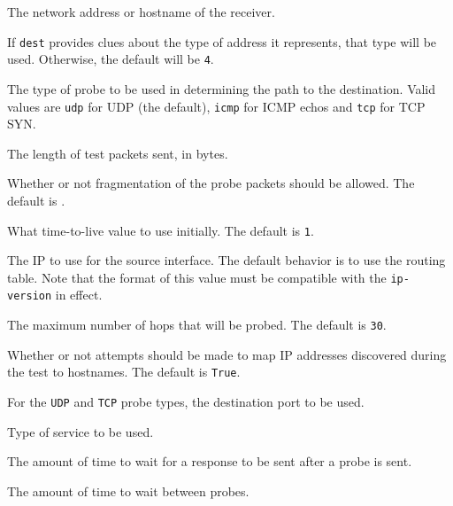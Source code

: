\documentclass[10pt]{article}
\begin{document}
 The network address or hostname of the receiver.

 If {\tt dest} provides clues about the type of
address it represents, that type will be used.  Otherwise, the default
will be {\tt 4}.

 The type of probe to be used in
determining the path to the destination.  Valid values are {\tt udp}
for UDP (the default), {\tt icmp} for ICMP echos and {\tt tcp} for TCP
SYN.

 The length of test packets sent, in
bytes.

 Whether or not fragmentation of the
probe packets should be allowed.  The default is \false.

 What time-to-live value to use
initially.  The default is {\tt 1}.




 The IP to use for the source interface.  The
default behavior is to use the routing table.  Note that the format of
this value must be compatible with the {\tt ip-version} in effect.

 The maximum number of hops that will be
probed.  The default is {\tt 30}.

 Whether or not attempts should be made
to map IP addresses discovered during the test to hostnames.  The
default is {\tt True}.

 For the {\tt UDP} and {\tt TCP} probe
types, the destination port to be used.

 Type of service to be used.  

 The amount of time to wait for a response
to be sent after a probe is sent.



 The amount of time to wait between
probes.

\end{document}
